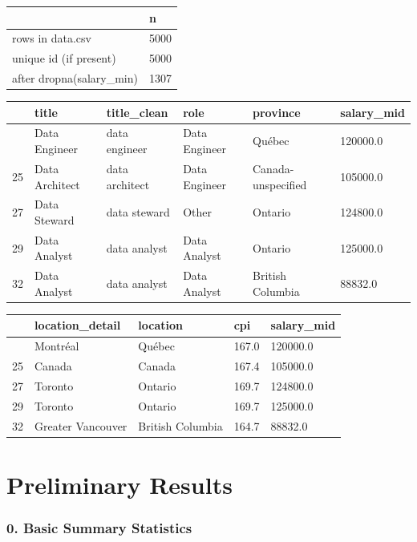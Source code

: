 \documentclass[
  letterpaper,
  DIV=11,
  numbers=noendperiod]{scrartcl}
\begin{document}
\begin{longtable}[]{@{}ll@{}}
\toprule\noalign{}
& n \\
\midrule\noalign{}
\endhead
\bottomrule\noalign{}
\endlastfoot
rows in data.csv & 5000 \\
unique id (if present) & 5000 \\
after dropna(salary\_min) & 1307 \\
\end{longtable}

\begin{longtable}[]{@{}llllll@{}}
\toprule\noalign{}
& title & title\_clean & role & province & salary\_mid \\
\midrule\noalign{}
\endhead
\bottomrule\noalign{}
\endlastfoot
23 & Data Engineer & data engineer & Data Engineer & Québec &
120000.0 \\
25 & Data Architect & data architect & Data Engineer &
Canada-unspecified & 105000.0 \\
27 & Data Steward & data steward & Other & Ontario & 124800.0 \\
29 & Data Analyst & data analyst & Data Analyst & Ontario & 125000.0 \\
32 & Data Analyst & data analyst & Data Analyst & British Columbia &
88832.0 \\
\end{longtable}

\begin{longtable}[]{@{}lllll@{}}
\toprule\noalign{}
& location\_detail & location & cpi & salary\_mid \\
\midrule\noalign{}
\endhead
\bottomrule\noalign{}
\endlastfoot
23 & Montréal & Québec & 167.0 & 120000.0 \\
25 & Canada & Canada & 167.4 & 105000.0 \\
27 & Toronto & Ontario & 169.7 & 124800.0 \\
29 & Toronto & Ontario & 169.7 & 125000.0 \\
32 & Greater Vancouver & British Columbia & 164.7 & 88832.0 \\
\end{longtable}

\section{Preliminary Results}\label{preliminary-results}

\subsubsection{0. Basic Summary
Statistics}\label{basic-summary-statistics}
\end{document}
